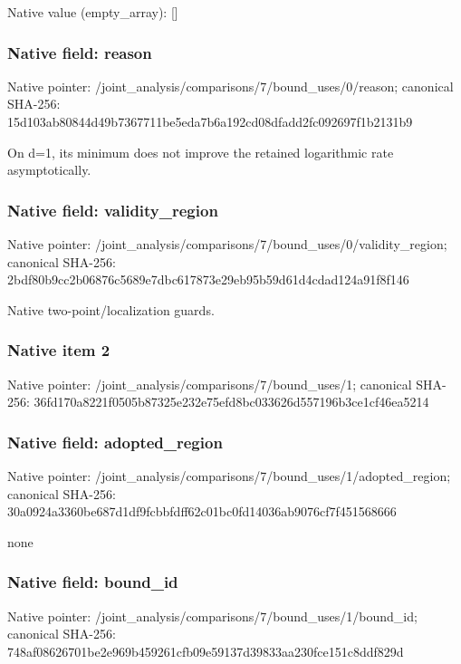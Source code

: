 \documentclass[10pt,a4paper]{article}
\begin{document}
Native value (empty\_\allowbreak{}array): []

\subsubsection{Native field: reason}
Native pointer: /joint\_\allowbreak{}analysis/comparisons/7/bound\_\allowbreak{}uses/0/reason; canonical SHA-256: 15d103ab80844d49b7367711be5eda7b6a192cd08dfadd2fc092697f1b2131b9

\begingroup\raggedright\sloppy On d=\allowbreak{}1,\allowbreak{} its minimum does not improve the retained logarithmic rate asymptotically.\par\endgroup

\subsubsection{Native field: validity\_\allowbreak{}region}
Native pointer: /joint\_\allowbreak{}analysis/comparisons/7/bound\_\allowbreak{}uses/0/validity\_\allowbreak{}region; canonical SHA-256: 2bdf80b9cc2b06876c5689e7dbc617873e29eb95b59d61d4cdad124a91f8f146

\begingroup\raggedright\sloppy Native two-point/\allowbreak{}localization guards.\par\endgroup

\subsubsection{Native item 2}
Native pointer: /joint\_\allowbreak{}analysis/comparisons/7/bound\_\allowbreak{}uses/1; canonical SHA-256: 36fd170a8221f0505b87325e232e75efd8bc033626d557196b3ce1cf46ea5214

\subsubsection{Native field: adopted\_\allowbreak{}region}
Native pointer: /joint\_\allowbreak{}analysis/comparisons/7/bound\_\allowbreak{}uses/1/adopted\_\allowbreak{}region; canonical SHA-256: 30a0924a3360be687d1df9fcbbfdff62c01bc0fd14036ab9076cf7f451568666

\begingroup\raggedright\sloppy none\par\endgroup

\subsubsection{Native field: bound\_\allowbreak{}id}
Native pointer: /joint\_\allowbreak{}analysis/comparisons/7/bound\_\allowbreak{}uses/1/bound\_\allowbreak{}id; canonical SHA-256: 748af08626701be2e969b459261cfb09e59137d39833aa230fce151c8ddf829d
\end{document}
